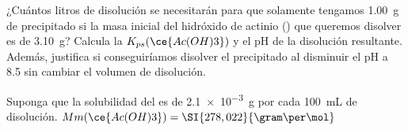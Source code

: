¿Cuántos litros de disolución se necesitarán para que solamente tengamos \SI{1,00}{\gram} de precipitado si la masa inicial del hidróxido de actinio () que queremos disolver es de \SI{3,10}{\gram}? Calcula la $K_{ps}(\ce{Ac(OH)3})$ y el pH de la disolución resultante. Además, justifica si conseguiríamos disolver el precipitado al disminuir el pH a \num{8,5} sin cambiar el volumen de disolución.

Suponga que la solubilidad del  es de \SI{2,1e-3}{\gram} por cada \SI{100}{\milli\liter} de disolución. $Mm(\ce{Ac(OH)3}) = \SI{278,022}{\gram\per\mol}$
